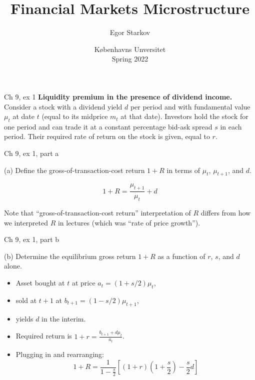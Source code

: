 \documentclass[english,10pt
,aspectratio=169
]{beamer}
\title{Financial Markets Microstructure}
\author{Egor Starkov}
\date{K{\o}benhavns Unversitet \\
	Spring 2022}
\begin{document}
	

\begin{frame}{Ch 9, ex 1}
	\textbf{Liquidity premium in the presence of dividend income.}
	Consider a stock with a dividend yield $d$ per period and with fundamental
	value $\mu _{t}$ at date $t$ (equal to its midprice $m_{t}$ at that date).
	Investors hold the stock for one period and can trade it at a constant
	percentage bid-ask spread $s$ in each period. Their required rate of return
	on the stock is given, equal to $r$.
\end{frame}


\begin{frame}{Ch 9, ex 1, part a}
	\begin{exampleblock}{}
		(a) Define the gross-of-transaction-cost return $1+R$ in terms of $\mu _{t}$, $\mu _{t+1}$, and $d$.
	\end{exampleblock}
	
	\pause
	
	\[ 1+R = \frac{\mu_{t+1}}{\mu_t} + d \]
	
	Note that ``gross-of-transaction-cost return'' interpretation of $R$ differs from how we interpreted $R$ in lectures (which was ``rate of price growth'').
\end{frame}


\begin{frame}{Ch 9, ex 1, part b}
	\begin{exampleblock}{}
		(b) Determine the equilibrium gross return $1+R$ as a function of $r$, $s$, and $d$ alone.
	\end{exampleblock}
	
	\pause
	
	\begin{itemize}
		\item Asset bought at $t$ at price $a_t = (1 + s/2) \mu_t$,
		\item sold at $t+1$ at $b_{t+1} = (1 - s/2) \mu_{t+1}$,
		\item yields $d$ in the interim.
		\item Required return is $1 + r = \frac{b_{t+1} + d \mu_t}{a_t}$.
		\item Plugging in and rearranging:
		\[ 1+R = \frac{1}{1-\frac{s}{2}} \left[ (1+r)\left(1+\frac{s}{2}\right) - \frac{s}{2} d \right] \]
	\end{itemize}
\end{frame}
\end{document}
